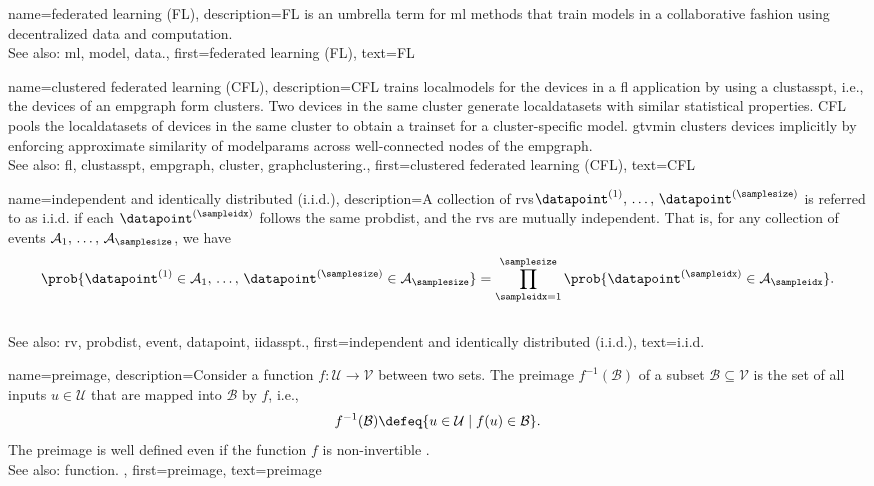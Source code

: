 {name={federated learning (FL)}, 
	description={FL 
		is an umbrella term for \gls{ml} methods that train \glspl{model} in a collaborative 
		fashion using decentralized \gls{data} and computation.
				\\
		See also: \gls{ml}, \gls{model}, \gls{data}.},
	first={federated learning (FL)},
	text={FL} 
}
	
{name={clustered federated learning (CFL)}, 
	description={CFL trains \glspl{localmodel} for the 
 		\glspl{device} in a \gls{fl} application by using a \gls{clustasspt}, i.e., the \glspl{device} 
 		of an \gls{empgraph} form \glspl{cluster}. Two \glspl{device} in the same \gls{cluster} generate 
 		\glspl{localdataset} with similar statistical properties. CFL pools the \glspl{localdataset} of \glspl{device} 
 		in the same \gls{cluster} to obtain a \gls{trainset} for a \gls{cluster}-specific \gls{model}. 
 		\Gls{gtvmin} clusters \glspl{device} implicitly by enforcing approximate similarity of \glspl{modelparam} 
 		across well-connected nodes of the \gls{empgraph}.\\ 
 		See also: \gls{fl}, \gls{clustasspt}, \gls{empgraph}, \gls{cluster}, \gls{graphclustering}.},
	first={clustered federated learning (CFL)},
	text={CFL} 
}

{name={independent and identically distributed (i.i.d.)}, 
	description={A collection of \glspl{rv}\linebreak $\datapoint^{(1)}, \,\ldots, \,\datapoint^{(\samplesize)}$ is 
		referred to as i.i.d. 
		if each $\datapoint^{(\sampleidx)}$ follows the same \gls{probdist}, and 
		the \glspl{rv} are mutually independent. That is, for any collection of 
		\glspl{event} $\mathcal{A}_1, \,\ldots, \,\mathcal{A}_\samplesize$, we have
       		\[
          		\prob{ \datapoint^{(1)} \in \mathcal{A}_1, \,\ldots, \,\datapoint^{(\samplesize)} \in \mathcal{A}_{\samplesize}} 
         		= \prod_{\sampleidx=1}^{\samplesize} \prob{ \datapoint^{(\sampleidx)} \in \mathcal{A}_\sampleidx}.
         	\]
				\\
		See also: \gls{rv}, \gls{probdist}, \gls{event}, \gls{datapoint}, \gls{iidasspt}.},
	first={independent and identically distributed (i.i.d.)},
	text={{i.i.d.}} 
}

{name={preimage}, 
	description={Consider a \gls{function} $f\colon \mathcal{U} \rightarrow \mathcal{V}$ 
		between two sets. The preimage $f^{-1}(\mathcal{B})$ of a subset $\mathcal{B} \subseteq \mathcal{V}$ is the set 
		of all inputs $u \in \mathcal{U}$ that are mapped into $\mathcal{B}$ by $f$, i.e.,
		\[
		f^{-1}(\mathcal{B}) \defeq \{ u \in \mathcal{U} \mid f(u) \in \mathcal{B} \}.
		\]
		The preimage is well defined even if the \gls{function} $f$ is non-invertible \cite{RudinBookPrinciplesMatheAnalysis}.
		\\
		See also: \gls{function}. },
	first={preimage},
	text={preimage}
}

